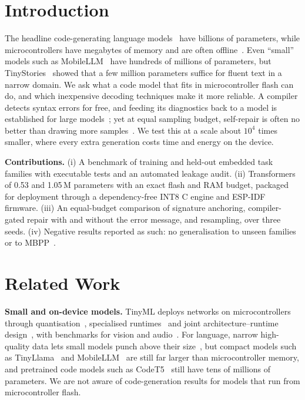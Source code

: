 \documentclass[journal]{IEEEtran}
\begin{document}
\section{Introduction}
The headline code-generating language models~\cite{chen2021codex,li2022alphacode} have billions of parameters, while microcontrollers have megabytes of memory and are often offline~\cite{warden2019tinyml,david2021tflm,lin2020mcunet}. Even ``small'' models such as MobileLLM~\cite{liu2024mobilellm} have hundreds of millions of parameters, but TinyStories~\cite{eldan2023tinystories} showed that a few million parameters suffice for fluent text in a narrow domain. We ask what a code model that fits in microcontroller flash can do, and which inexpensive decoding techniques make it more reliable. A compiler detects syntax errors for free, and feeding its diagnostics back to a model is established for large models~\cite{gupta2017deepfix,yasunaga2020drrepair,chen2024selfdebug}; yet at equal sampling budget, self-repair is often no better than drawing more samples~\cite{olausson2024selfrepair}. We test this at a scale about $10^{4}$ times smaller, where every extra generation costs time and energy on the device.

\textbf{Contributions.} (i) A benchmark of \nfamtrain{} training and \nfamheld{} held-out embedded task families with executable tests and an automated leakage audit. (ii) Transformers of 0.53 and 1.05\,M parameters with an exact flash and RAM budget, packaged for deployment through a dependency-free INT8 C engine and ESP-IDF firmware. (iii) An equal-budget comparison of signature anchoring, compiler-gated repair with and without the error message, and resampling, over three seeds. (iv) Negative results reported as such: no generalisation to unseen families or to MBPP~\cite{austin2021mbpp}.

\section{Related Work}
\textbf{Small and on-device models.} TinyML deploys networks on microcontrollers through quantisation~\cite{jacob2018quant}, specialised runtimes~\cite{david2021tflm} and joint architecture--runtime design~\cite{lin2020mcunet}, with benchmarks for vision and audio~\cite{banbury2021mlperftiny}. For language, narrow high-quality data lets small models punch above their size~\cite{eldan2023tinystories,gunasekar2023textbooks}, but compact models such as TinyLlama~\cite{zhang2024tinyllama} and MobileLLM~\cite{liu2024mobilellm} are still far larger than microcontroller memory, and pretrained code models such as CodeT5~\cite{wang2021codet5} still have tens of millions of parameters. We are not aware of code-generation results for models that run from microcontroller flash.
\end{document}
